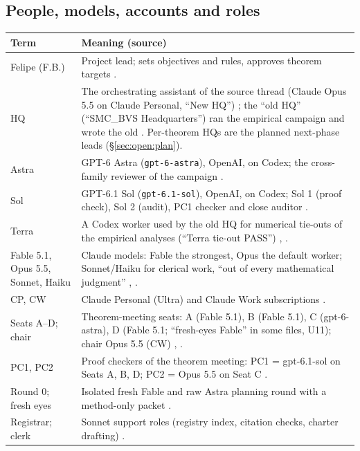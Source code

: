 \subsection{People, models, accounts and roles}
{\small
\begin{xltabular}{\textwidth}{@{}>{\raggedright\arraybackslash}p{4.4cm}>{\raggedright\arraybackslash}X@{}}
\toprule
\textbf{Term} & \textbf{Meaning (source)} \\
\midrule
\endhead
Felipe (F.B.) & Project lead; sets objectives and rules, approves theorem targets . \\
HQ & The orchestrating assistant of the source thread (Claude Opus 5.5 on Claude Personal, ``New HQ'') ; the ``old HQ'' (``SMC\_BVS Headquarters'') ran the empirical campaign and wrote the old . Per-theorem HQs are the planned next-phase leads (\S\ref{sec:open:plan}). \\
Astra & GPT-6 Astra (\texttt{gpt-6-astra}), OpenAI, on Codex; the cross-family reviewer of the campaign . \\
Sol & GPT-6.1 Sol (\texttt{gpt-6.1-sol}), OpenAI, on Codex; Sol 1 (proof check), Sol 2 (audit), PC1 checker and close auditor . \\
Terra & A Codex worker used by the old HQ for numerical tie-outs of the empirical analyses (``Terra tie-out PASS'') , . \\
Fable 5.1, Opus 5.5, Sonnet, Haiku & Claude models: Fable the strongest, Opus the default worker; Sonnet/Haiku for clerical work, ``out of every mathematical judgment'' , . \\
CP, CW & Claude Personal (Ultra) and Claude Work subscriptions . \\
Seats A--D; chair & Theorem-meeting seats: A (Fable 5.1), B (Fable 5.1), C (gpt-6-astra), D (Fable 5.1; ``fresh-eyes Fable'' in some files, U11); chair Opus 5.5 (CW) , . \\
PC1, PC2 & Proof checkers of the theorem meeting: PC1 = gpt-6.1-sol on Seats A, B, D; PC2 = Opus 5.5 on Seat C . \\
Round 0; fresh eyes & Isolated fresh Fable and raw Astra planning round with a method-only packet . \\
Registrar; clerk & Sonnet support roles (registry index, citation checks, charter drafting) . \\
\bottomrule
\end{xltabular}
}

